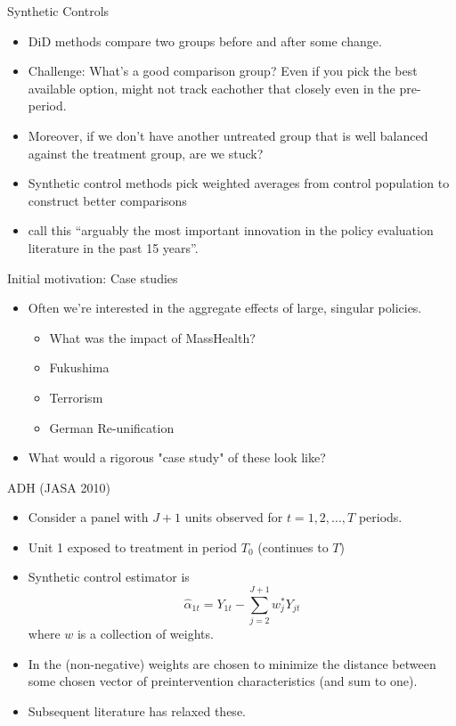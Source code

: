 \begin{frame}{Synthetic Controls}
  \begin{itemize}
    \item DiD methods compare two groups before and after some change. 
    \item Challenge: What's a good comparison group? Even if you pick the best available option, might not track eachother that closely even in the pre-period. 
    \item Moreover, if we don't have another untreated group that is well balanced against the treatment group, are we stuck?
    \item Synthetic control methods pick weighted averages from control population to construct better comparisons \citep{abadie2003economic, abadie2010synthetic}
    \item \citet{athey2017state} call this ``arguably the most important innovation in the policy evaluation literature in the past 15 years''.
  \end{itemize}              
\end{frame}

\begin{frame}{Initial motivation: Case studies}
  \begin{itemize}
    \item Often we're interested in the aggregate effects of large, singular policies. 
    \begin{itemize}
      \item What was the impact of MassHealth?
      \item Fukushima 
      \item Terrorism 
      \item German Re-unification
    \end{itemize}  
    \item What would a rigorous "case study" of these look like?
  \end{itemize}              
\end{frame}

\begin{frame}{ADH (JASA 2010)}
  \begin{itemize}
  \item Consider a panel with $J+1$ units observed for $t=1,2,...,T$ periods.
  \item Unit 1 exposed to treatment in period $T_0$ (continues to $T$)
  \item Synthetic control estimator is 
  $$ \hat \alpha_{1t} = Y_{1t} - \sum^{J+1}_{j=2}w_j^{*}Y_{jt} $$ where $w$ is a collection of weights. 
  \item In \cite{abadie2010synthetic} the (non-negative) weights are chosen to minimize the distance between some chosen vector of preintervention characteristics (and sum to one). 
  \item Subsequent literature has relaxed these. 
  \end{itemize}
\end{frame}

